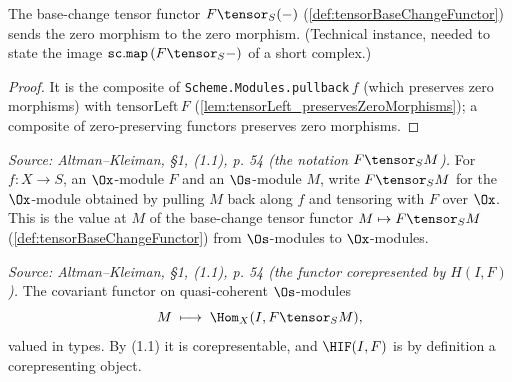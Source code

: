 \begin{lemma}
  \label{lem:tensorBaseChangeFunctor_preservesZeroMorphisms}
  The base-change tensor functor $F \tensor_S (-)$
  (\cref{def:tensorBaseChangeFunctor}) sends the zero morphism to the zero
  morphism. (Technical instance, needed to state the image
  $\mathtt{sc.map}\,(F \tensor_S -)$ of a short complex.)
  \begin{proof}
    It is the composite of \texttt{Scheme.Modules.pullback}\,$f$ (which preserves
    zero morphisms) with $\mathrm{tensorLeft}\,F$
    (\cref{lem:tensorLeft_preservesZeroMorphisms}); a composite of zero-preserving
    functors preserves zero morphisms.
  \end{proof}
\end{lemma}

\begin{definition}
  \label{def:tensorBC}
  \textit{Source: Altman--Kleiman, §1, (1.1), p. 54 (the notation $F \tensor_S M$).}
  For $f : X \to S$, an $\Ox$-module $F$ and an $\Os$-module $M$, write
  $F \tensor_S M$ for the $\Ox$-module obtained by pulling $M$ back along $f$ and
  tensoring with $F$ over $\Ox$. This is the value at $M$ of the base-change
  tensor functor $M \mapsto F \tensor_S M$ (\cref{def:tensorBaseChangeFunctor})
  from $\Os$-modules to $\Ox$-modules.
\end{definition}

\begin{definition}
  \label{def:homTensorFunctor}
  \textit{Source: Altman--Kleiman, §1, (1.1), p. 54 (the functor corepresented by $H(I,F)$).}
  The covariant functor on quasi-coherent $\Os$-modules
  \[
    M \;\longmapsto\; \Hom_X(I, F \tensor_S M),
  \]
  valued in types. By (1.1) it is corepresentable, and $\HIF(I,F)$ is by
  definition a corepresenting object.
\end{definition}


